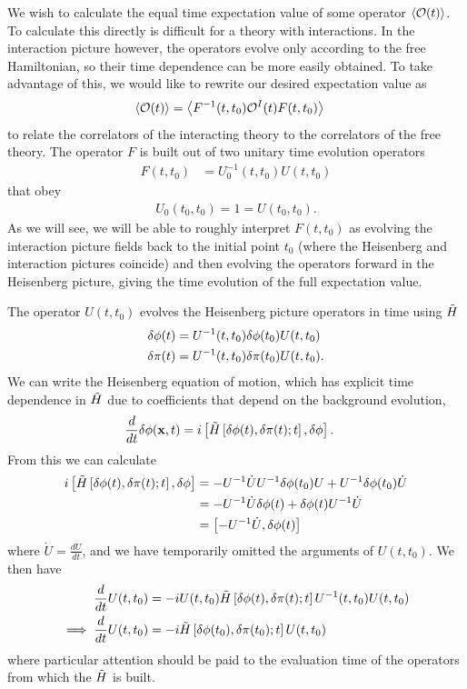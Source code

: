 We wish to calculate the equal time expectation value of some operator $\left<\mathcal{O}(t)\right>$.
To calculate this directly is difficult for a theory with interactions.
In the interaction picture however, the operators evolve only according to the
free Hamiltonian, so their time dependence can be more easily obtained. To take advantage of this,
we would like to rewrite our desired expectation value as
\begin{align}
    \left<\mathcal{O}(t)\right> &= \left<F^{-1}(t,t_0)\mathcal{O}^I(t) F(t,t_0)\right>\label{heis_to_int}
\end{align}
to relate the correlators of the interacting theory to the correlators of the
free theory.
The operator $F$ is built out of two unitary time evolution operators
\begin{align}
    F(t,t_0) &= U_0^{-1}(t,t_0)U(t,t_0)\label{f_def}
\end{align}
that obey
\begin{align}
    U_0(t_0,t_0) = 1 = U(t_0,t_0).
\end{align}
As we will see, we will be able to roughly interpret $F(t,t_0)$ as evolving the interaction picture fields
back to the initial point $t_0$ (where the Heisenberg and interaction pictures coincide) and then
evolving the operators forward in the Heisenberg picture, giving the time evolution
of the full expectation value.


The operator $U(t,t_0)$ evolves the Heisenberg picture operators in time
using $\tilde{H}$
\begin{align}
    \delta\phi(t) &= U^{-1}(t,t_0)\delta\phi(t_0)U(t,t_0)\\
    \delta\pi(t) &= U^{-1}(t,t_0)\delta\pi(t_0)U(t,t_0).
\end{align}
We can write the Heisenberg equation of motion, which has
explicit time dependence in $\tilde{H}$ due to coefficients
that depend on the background evolution,
\begin{align}
    \frac{d}{dt}\delta\phi(\mathbf{x},t) &= i\left[\tilde{H}\left[\delta\phi(t),\delta\pi(t);t\right],\delta\phi\right].\label{heis_phi}
\end{align}
From this we can calculate
\begin{align}
    i\left[\tilde{H}\left[\delta\phi(t),\delta\pi(t);t\right],\delta\phi\right]
    &= -U^{-1}\dot{U}U^{-1}\delta\phi(t_0) U+U^{-1}\delta\phi(t_0) \dot{U}\\
    &= -U^{-1}\dot{U}\delta\phi(t)+\delta\phi(t)U^{-1} \dot{U}\\
    &= \left[-U^{-1}\dot{U},\delta\phi(t)\right]
\end{align}
where $\dot{U}=\frac{dU}{dt}$,
and we have temporarily omitted the arguments of $U(t,t_0)$.
We then have
\begin{align}
    \frac{d}{dt}U(t,t_0) &= -iU(t,t_0)\tilde{H}\left[\delta\phi(t),\delta\pi(t);t\right]U^{-1}(t,t_0)U(t,t_0)\\
    \implies \frac{d}{dt}U(t,t_0) &= -i\tilde{H}\left[\delta\phi(t_0),\delta\pi(t_0);t\right]U(t,t_0)\label{u_def}
\end{align}
where particular attention should be paid to the evaluation time of the operators from
which the $\tilde{H}$ is built.


